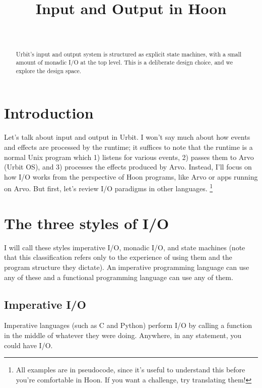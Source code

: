 \documentclass[twoside]{article}
\title{Input and Output in Hoon}
\author{\authorname~\authorpatp \\ \affiliation}
\date{}
\begin{document}
\maketitle
\thispagestyle{firststyle}

\begin{abstract}
  Urbit's input and output system is structured as explicit state
  machines, with a small amount of monadic I/O at the top level.
  This is a deliberate design choice, and we explore the design space.
\end{abstract}

\setcounter{page}{45}

\tableofcontents

\section{Introduction}

Let's talk about input and output in Urbit. I won't say much about how events and
effects are processed by the runtime; it suffices to note that the
runtime is a normal Unix program which 1) listens for various events,
2) passes them to Arvo (Urbit OS), and 3) processes the effects
produced by Arvo. Instead, I'll focus on how I/O works from the
perspective of Hoon programs, like Arvo or apps running on Arvo. But
first, let's review I/O paradigms in other languages.
\footnote{All examples are in pseudocode, since it's useful to understand
this before you're comfortable in Hoon. If you want a challenge, try translating them!}

\section{The three styles of I/O}\label{the-three-styles-of-io}

I will call these styles imperative I/O, monadic I/O, and state machines
(note that this classification refers only to the experience of using
them and the program structure they dictate). An imperative programming
language can use any of these and a functional programming language can
use any of them.

\subsection{Imperative I/O}\label{imperative-io}

Imperative languages (such as C and Python) perform I/O by calling a
function in the middle of whatever they were doing. Anywhere, in any
statement, you could have I/O.
\end{document}
